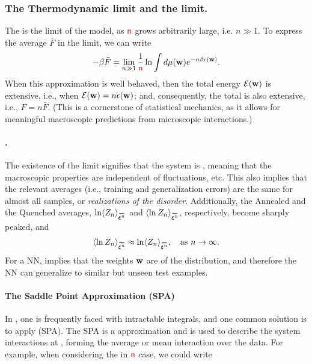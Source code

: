 \subsubsection{The Thermodynamic limit and the \LargeN limit.}
\label{sxn:largeN_and_SPA}
The \ThermodynamicLimit is the \LargeN limit of the model, as ${\color{red}\sf{n}}$ grows arbitrarily large, i.e. $n \gg 1$.
To express the average \FreeEnergy $\bar{F}$ in the \LargeN limit, we can write
\begin{align}
  -\beta\bar{F} = \lim_{n\gg 1}\frac{1}{{\color{red}\sf{n}}}\ln \int d\mu({\mathbf{w}}) e^{-n\beta\epsilon({\mathbf{w}})}  .
\end{align}
When this \LargeN approximation is well behaved,
then the total energy $\mathcal{E}(\mathbf{w})$ is extensive, i.e., when $\mathcal{E}(\mathbf{w})=n\epsilon({\mathbf{w}})$;
and, consequently, the total \FreeEnergy is also extensive, i.e., $F=n\bar{F}$.
(This is a cornerstone of statistical mechanics, as it allows for meaningful macroscopic predictions from microscopic interactions.)

\paragraph{\SelfAveraging.}
The existence of the limit signifies that the system is \emph{\SelfAveraging}, meaning that
the macroscopic properties are independent of fluctuations, etc.
This also implies that the relevant averages
(i.e., training and generalization errors) are the same for almost all samples, or \emph{realizations of the disorder}.
Additionally, the Annealed and the Quenched averages,
$\ln \langle Z_n \rangle_{\AVGNDXIn}$ and $\langle \ln Z_n \rangle_{\AVGNDXIn}$, respectively,
become sharply peaked, and
\begin{align}
\langle \ln Z_n \rangle_{\AVGNDXIn} \approx \ln \langle Z_n \rangle_{\AVGNDXIn}, \quad \text{as } n \to \infty .
\end{align}
For a NN, \SelfAveraging implies that the weights ${\mathbf{w}}$ are \emph{\Typical} of the distribution,
and therefore the NN can generalize to similar but unseen test examples.

\paragraph{The Saddle Point Approximation (SPA) }In \STATMECH, one is frequently faced with intractable integrals, and one common solution is to apply \SaddlePointApproximation (SPA). The SPA is a \LargeN approximation and is used to describe the system interactions at \LargeN, forming the average or mean interaction over the data.
For example, when considering the \LargeN in ${\color{red}\sf{n}}$ case, we could write

